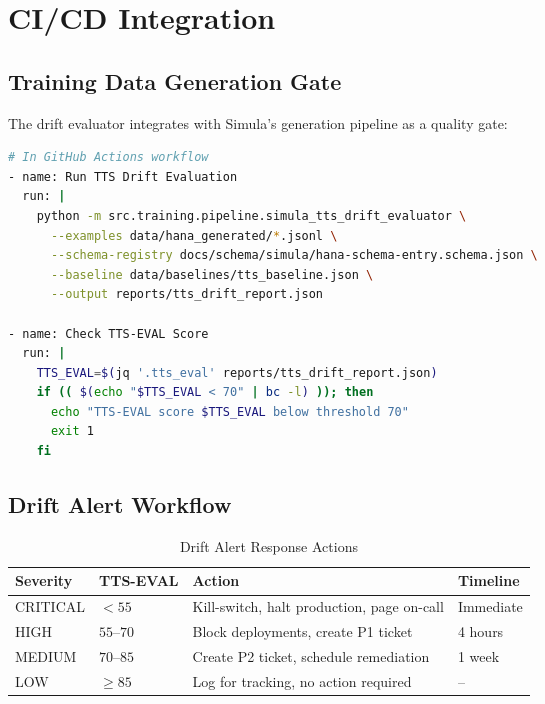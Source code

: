 \section{CI/CD Integration}

\subsection{Training Data Generation Gate}

The drift evaluator integrates with Simula's generation pipeline as a quality gate:

\begin{lstlisting}[language=bash,caption={CI/CD gate for TTS drift}]
# In GitHub Actions workflow
- name: Run TTS Drift Evaluation
  run: |
    python -m src.training.pipeline.simula_tts_drift_evaluator \
      --examples data/hana_generated/*.jsonl \
      --schema-registry docs/schema/simula/hana-schema-entry.schema.json \
      --baseline data/baselines/tts_baseline.json \
      --output reports/tts_drift_report.json
    
- name: Check TTS-EVAL Score
  run: |
    TTS_EVAL=$(jq '.tts_eval' reports/tts_drift_report.json)
    if (( $(echo "$TTS_EVAL < 70" | bc -l) )); then
      echo "TTS-EVAL score $TTS_EVAL below threshold 70"
      exit 1
    fi
\end{lstlisting}

\subsection{Drift Alert Workflow}

\begin{table}[htbp]
\centering
\caption{Drift Alert Response Actions}
\begin{tabularx}{\textwidth}{@{}l l X l@{}}
\toprule
\textbf{Severity} & \textbf{TTS-EVAL} & \textbf{Action} & \textbf{Timeline} \\
\midrule
CRITICAL & $< 55$ & Kill-switch, halt production, page on-call & Immediate \\
HIGH & $55$--$70$ & Block deployments, create P1 ticket & 4 hours \\
MEDIUM & $70$--$85$ & Create P2 ticket, schedule remediation & 1 week \\
LOW & $\geq 85$ & Log for tracking, no action required & -- \\
\bottomrule
\end{tabularx}
\end{table}

